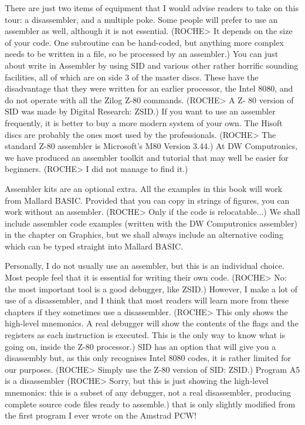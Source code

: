 There  are just two items of equipment that I would advise readers to take  on 
this tour: a disassembler, and a multiple poke. Some people will prefer to use 
an assembler as well, although it is not essential. (ROCHE> It depends on  the 
size of your code. One subroutine can be hand-coded, but anything more complex 
needs to be written in a file, so be processed by an assembler.) You can  just 
about  write  in  Assembler by using SID and  various  other  rather  horrific 
sounding  facilities,  all of which are on side 3 of the master  discs.  These 
have  the  disadvantage that they were written for an earlier  processor,  the 
Intel 8080, and do not operate with all the Zilog Z-80 commands. (ROCHE> A  Z-
80  version of SID was made by Digital Research: ZSID.) If you want to use  an 
assembler  frequently, it is better to buy a more modern system of  your  own. 
The Hisoft discs are probably the ones most used by the professionals. (ROCHE> 
The  standard  Z-80  assembler  is  Microsoft's  M80  Version  3.44.)  At   DW 
Computronics, we have produced an assembler toolkit and tutorial that may well 
be easier for beginners. (ROCHE> I did not manage to find it.)

Assembler kits are an optional extra. All the examples in this book will  work 
from Mallard BASIC. Provided that you can copy in strings of figures, you  can 
work  without  an assembler. (ROCHE> Only if the code  is  relocatable...)  We 
shall  include  assembler  code examples (written  with  the  DW  Computronics 
assembler)  in  the  chapter  on Graphics, but  we  shall  always  include  an 
alternative coding which can be typed straight into Mallard BASIC.

Personally,  I  do  not usually use an assembler, but this  is  an  individual 
choice.  Most  people feel that it is essential for writing  their  own  code. 
(ROCHE> No: the most important tool is a good debugger, like ZSID.) However, I 
make a lot of use of a disassembler, and I think that most readers will  learn 
more  from these chapters if they sometimes use a disassembler.  (ROCHE>  This 
only shows the high-level mnemonics. A real debugger will show the contents of 
the flags and the registers as each instruction is executed. This is the  only 
way  to know what is going on, inside the Z-80 processor.) SID has  an  option 
that  will  give  you a disassembly but, as this only  recognises  Intel  8080 
codes,  it  is rather limited for our purposes. (ROCHE> Simply  use  the  Z-80 
version of SID: ZSID.) Program A5 is a disassembler (ROCHE> Sorry, but this is 
just showing the high-level mnemonics: this is a subset of any debugger, not a 
real  disassembler, producing complete source code files ready  to  assemble.) 
that  is  only slightly modified from the first program I ever  wrote  on  the 
Amstrad PCW!

